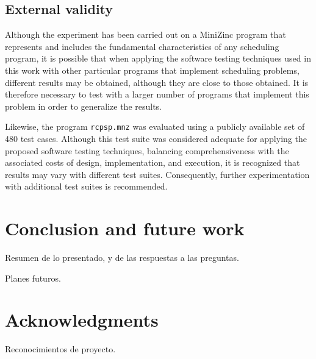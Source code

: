 \subsection{External validity}

Although the experiment has been carried out on a MiniZinc program that represents and includes the fundamental characteristics of any scheduling program, it is possible that when applying the software testing techniques used in this work with other particular programs that implement scheduling problems, different results may be obtained, although they are close to those obtained. It is therefore necessary to test with a larger number of programs that implement this problem in order to generalize the results. 

Likewise, the program \texttt{rcpsp.mnz} was evaluated using a publicly available set of 480 test cases. Although this test suite was considered adequate for applying the proposed software testing techniques, balancing comprehensiveness with the associated costs of design, implementation, and execution, it is recognized that results may vary with different test suites. Consequently, further experimentation with additional test suites is recommended.


\section{Conclusion and future work}
\label{sec:conclusion}

Resumen de lo presentado, y de las respuestas a las preguntas.

Planes futuros.

\section*{Acknowledgments}

Reconocimientos de proyecto.



\appendix



